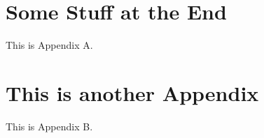 \documentclass[11pt,ms]{uddissert2022}
\begin{document}
\pagestyle{plain}








%




\appendix

\begin{appendices}
	\appendix
	
    \chapter{Some Stuff at the End}

    This is Appendix A.  

    \chapter{This is another Appendix}

    This is Appendix B.  

\end{appendices}
\end{document}
